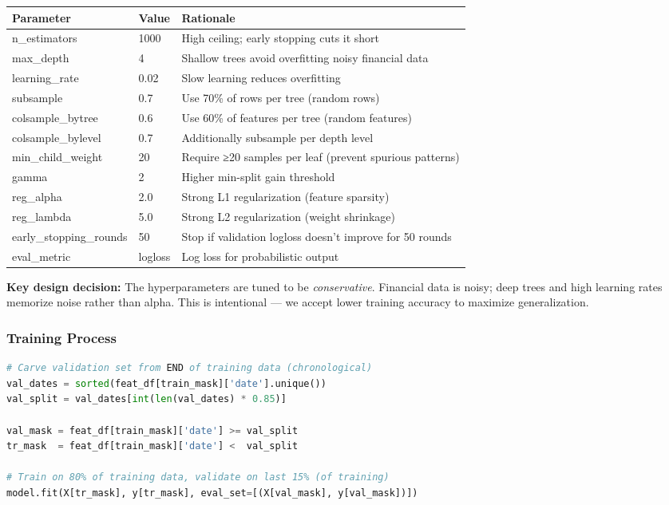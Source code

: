 \documentclass[11pt,a4paper]{article}
\begin{document}
\begin{table}[h]
\centering
\begin{tabular}{lll}
\toprule
\textbf{Parameter} & \textbf{Value} & \textbf{Rationale} \\
\midrule
n\_estimators & 1000 & High ceiling; early stopping cuts it short \\
max\_depth & 4 & Shallow trees avoid overfitting noisy financial data \\
learning\_rate & 0.02 & Slow learning reduces overfitting \\
subsample & 0.7 & Use 70\% of rows per tree (random rows) \\
colsample\_bytree & 0.6 & Use 60\% of features per tree (random features) \\
colsample\_bylevel & 0.7 & Additionally subsample per depth level \\
min\_child\_weight & 20 & Require ≥20 samples per leaf (prevent spurious patterns) \\
gamma & 2 & Higher min-split gain threshold \\
reg\_alpha & 2.0 & Strong L1 regularization (feature sparsity) \\
reg\_lambda & 5.0 & Strong L2 regularization (weight shrinkage) \\
early\_stopping\_rounds & 50 & Stop if validation logloss doesn't improve for 50 rounds \\
eval\_metric & logloss & Log loss for probabilistic output \\
\bottomrule
\end{tabular}
\end{table}

\textbf{Key design decision:} The hyperparameters are tuned to be \emph{conservative}. Financial data is noisy; deep trees and high learning rates memorize noise rather than alpha. This is intentional — we accept lower training accuracy to maximize generalization.

\subsubsection{Training Process}

\begin{lstlisting}[language=Python, caption=Validation-Set Carving]
# Carve validation set from END of training data (chronological)
val_dates = sorted(feat_df[train_mask]['date'].unique())
val_split = val_dates[int(len(val_dates) * 0.85)]

val_mask = feat_df[train_mask]['date'] >= val_split
tr_mask  = feat_df[train_mask]['date'] <  val_split

# Train on 80% of training data, validate on last 15% (of training)
model.fit(X[tr_mask], y[tr_mask], eval_set=[(X[val_mask], y[val_mask])])
\end{lstlisting}
\end{document}
